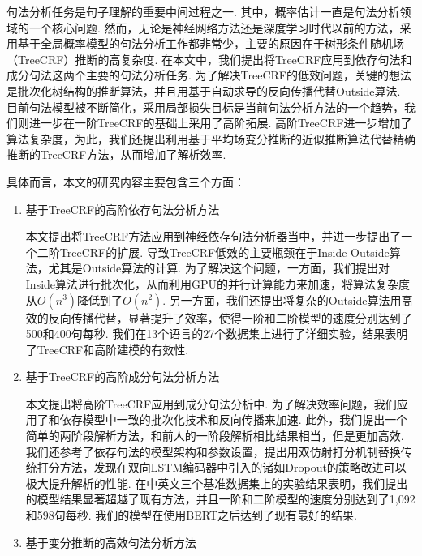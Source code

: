 
\begin{cabstract}
	句法分析任务是句子理解的重要中间过程之一.
	其中，概率估计一直是句法分析领域的一个核心问题.
	然而，无论是神经网络方法还是深度学习时代以前的方法，采用基于全局概率模型的句法分析工作都非常少，主要的原因在于树形条件随机场（TreeCRF）推断的高复杂度.
	在本文中，我们提出将TreeCRF应用到依存句法和成分句法这两个主要的句法分析任务.
	为了解决TreeCRF的低效问题，关键的想法是批次化树结构的推断算法，并且用基于自动求导的反向传播代替Outside算法.
	目前句法模型被不断简化，采用局部损失目标是当前句法分析方法的一个趋势，我们则进一步在一阶TreeCRF的基础上采用了高阶拓展.
	高阶TreeCRF进一步增加了算法复杂度，为此，我们还提出利用基于平均场变分推断的近似推断算法代替精确推断的TreeCRF方法，从而增加了解析效率.
	
	具体而言，本文的研究内容主要包含三个方面：
	\begin{enumerate}
		
		\item 基于TreeCRF的高阶依存句法分析方法
		      
		      本文提出将TreeCRF方法应用到神经依存句法分析器当中，并进一步提出了一个二阶TreeCRF的扩展.
		      导致TreeCRF低效的主要瓶颈在于Inside-Outside算法，尤其是Outside算法的计算.
		      为了解决这个问题，一方面，我们提出对Inside算法进行批次化，从而利用GPU的并行计算能力来加速，将算法复杂度从$O(n^3)$降低到了$O(n^2)$.
		      另一方面，我们还提出将复杂的Outside算法用高效的反向传播代替，显著提升了效率，使得一阶和二阶模型的速度分别达到了500和400句每秒.
		      我们在13个语言的27个数据集上进行了详细实验，结果表明了TreeCRF和高阶建模的有效性.
		      
		\item 基于TreeCRF的高阶成分句法分析方法
		      
		      本文提出将高阶TreeCRF应用到成分句法分析中.
		      为了解决效率问题，我们应用了和依存模型中一致的批次化技术和反向传播来加速.
		      此外，我们提出一个简单的两阶段解析方法，和前人的一阶段解析相比结果相当，但是更加高效.
		      我们还参考了依存句法的模型架构和参数设置，提出用双仿射打分机制替换传统打分方法，发现在双向LSTM编码器中引入的诸如Dropout的策略改进可以极大提升解析的性能.
		      在中英文三个基准数据集上的实验结果表明，我们提出的模型结果显著超越了现有方法，并且一阶和二阶模型的速度分别达到了1,092和598句每秒.
		      我们的模型在使用BERT之后达到了现有最好的结果.
		      
		\item 基于变分推断的高效句法分析方法
		      

\end{enumerate}
\end{cabstract}
